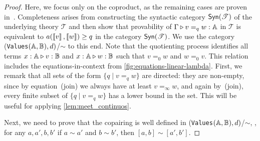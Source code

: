 \begin{proof}
  Here, we focus only on the coproduct, as the remaining cases are proven in~\cite{dahlqvist2022syntactic}.
  Completeness arises from constructing the syntactic category $\mathsf{Syn}(\mathscr{T})$ of the underlying  theory
  $\mathscr{T}$ and then show that provability of $\Gamma \triangleright v =_q w : \mathbb{A}$
  in $\mathscr{T}$ is equivalent to $a(\left \llbracket v \right \rrbracket,\left \llbracket w \right \rrbracket) \geq q$ in the category
  $\mathsf{Syn}(\mathscr{T})$. We use the category (\texttt{Values}$(\mathbb{A},\mathbb{B}),d)$/$\sim$ to this end.  Note that the quotienting process identifies all terms $x : \mathbb{A} \triangleright v : \mathbb{B}$ and $x : \mathbb{A} \triangleright w : \mathbb{B}$ such that $v =_0 w$ and $w =_0 v$. This relation includes the equations-in-context from \autoref{fig:equations-linear-lambda}.
     First, we remark that all sets of the form $\{ q \mid v =_q w \}$ are directed: they are non-empty, since by equation~(join) we always have at least $v =_{\infty} w$, and again by~(join), every finite subset of $\{ q \mid v =_q w \}$ has a lower bound in the set. This will be useful for applying \autoref{lem:meet_continuos}.
   
   Next, we need to prove that the copairing is well defined in (\texttt{Values}$(\mathbb{A},\mathbb{B}),d)$/$\sim$, \ie, for any $a, a', b, b'$ if $a\sim a'$ and $b\sim b'$, then $[a,b] \sim [a',b']$. 


\end{proof}
